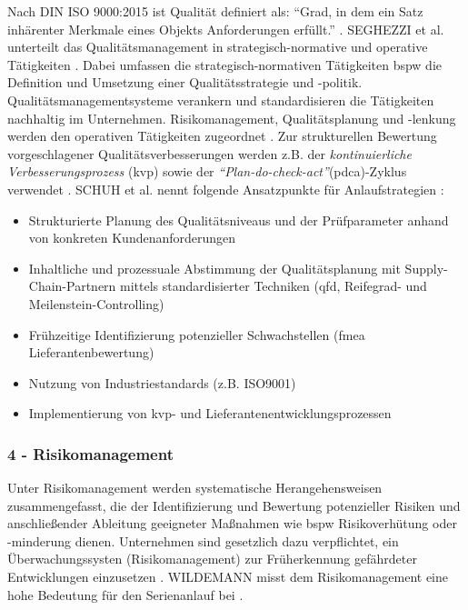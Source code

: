 Nach DIN ISO 9000:2015 ist Qualität definiert als: ``Grad, in dem ein Satz inhärenter Merkmale eines Objekts Anforderungen erfüllt.'' \cite[39]{ISO9000}. %
SEGHEZZI et al. unterteilt das Qualitätsmanagement in strategisch-normative und operative Tätigkeiten \cite{Seghezzi2013}. 
Dabei umfassen die strategisch-normativen Tätigkeiten \gls{bspw} die Definition und Umsetzung einer Qualitätsstrategie und -politik. Qualitätsmanagementsysteme verankern und standardisieren die Tätigkeiten nachhaltig im Unternehmen. 
Risikomanagement, Qualitätsplanung und -lenkung werden den operativen Tätigkeiten zugeordnet \cite{Seghezzi2013}. 
Zur strukturellen Bewertung vorgeschlagener Qualitätsverbesserungen werden z.B. der \textit{kontinuierliche Verbesserungsprozess} (\gls{kvp}) sowie der \textit{``Plan-do-check-act''}(\gls{pdca})-Zyklus verwendet \cite[17]{Schuh2008}.
% 
SCHUH et al. nennt folgende Ansatzpunkte für Anlaufstrategien \cite[17]{Schuh2008}: 
\begin{itemize}
 \item Strukturierte Planung des Qualitätsniveaus und der Prüfparameter anhand von konkreten Kundenanforderungen
 \item Inhaltliche und prozessuale Abstimmung der Qualitätsplanung mit Supply-Chain-Partnern mittels standardisierter Techniken (\gls{qfd}, Reifegrad- und Meilenstein-Controlling)
 \item Frühzeitige Identifizierung potenzieller Schwachstellen (\gls{fmea} Lieferantenbewertung)
 \item Nutzung von Industriestandards (z.B. ISO9001)
 \item Implementierung von \gls{kvp}- und Lieferantenentwicklungsprozessen
\end{itemize}

\subsubsection*{4 - Risikomanagement}
Unter Risikomanagement werden systematische Herangehensweisen zusammengefasst, die der Identifizierung und Bewertung potenzieller Risiken und anschließender Ableitung geeigneter Maßnahmen wie \gls{bspw} Risikoverhütung oder -minderung dienen. %
Unternehmen sind gesetzlich dazu verpflichtet, ein Überwachungssysten (Risikomanagement) zur Früherkennung gefährdeter Entwicklungen einzusetzen \cite[302]{Burghardt2006}.
WILDEMANN misst dem Risikomanagement eine hohe Bedeutung für den Serienanlauf bei \cite{Wildemann2004}. 

